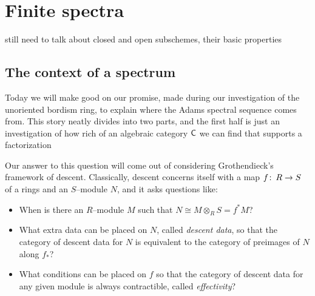
\chapter{Finite spectra}\label{ChapterFiniteSpectra}





still need to talk about closed and open subschemes, their basic properties



\section{The context of a spectrum}\label{StableContextLecture}


Today we will make good on our promise, made during our investigation of the unoriented bordism ring, to explain where the Adams spectral sequence comes from.  This story neatly divides into two parts, and the first half is just an investigation of how rich of an algebraic category $\mathsf{C}$ we can find that supports a factorization
\begin{center}
\end{center}
Our answer to this question will come out of considering Grothendieck's framework of descent.  Classically, descent concerns itself with a map $f\colon\thinspace R \to S$ of a rings and an $S$--module $N$, and it asks questions like:
\begin{itemize}
\item When is there an $R$--module $M$ such that $N \cong M \otimes_R S = f^* M$?
\item What extra data can be placed on $N$, called \textit{descent data}, so that the category of descent data for $N$ is equivalent to the category of preimages of $N$ along $f_*$?
\item What conditions can be placed on $f$ so that the category of descent data for any given module is always contractible, called \textit{effectivity}?
\end{itemize}

